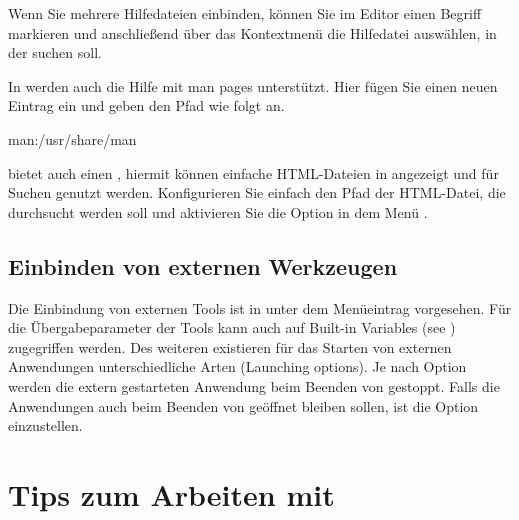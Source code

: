 Wenn Sie mehrere Hilfedateien einbinden, können Sie im Editor einen Begriff markieren und anschließend über das Kontextmenü  die Hilfedatei auswählen, in der \codeblocks suchen soll.


In \codeblocks werden auch die Hilfe mit man pages unterstützt. Hier fügen Sie einen neuen Eintrag  ein und geben den Pfad wie folgt an.

\begin{cmd}
man:/usr/share/man
\end{cmd}

\codeblocks bietet auch einen , hiermit können  einfache HTML-Dateien in \codeblocks angezeigt und für Suchen genutzt werden. Konfigurieren Sie einfach den Pfad der HTML-Datei, die durchsucht werden soll und aktivieren Sie die Option  in dem Menü .


%

\subsection{Einbinden von externen Werkzeugen}

Die Einbindung von externen Tools ist in \codeblocks unter dem Menüeintrag  vorgesehen. Für die Übergabeparameter der Tools kann auch auf Built-in Variables (see ) zugegriffen werden. Des weiteren existieren für das Starten von externen Anwendungen unterschiedliche Arten (Launching options). Je nach Option werden die extern gestarteten Anwendung beim Beenden von \codeblocks gestoppt. Falls die Anwendungen auch beim Beenden von \codeblocks geöffnet bleiben sollen, ist die Option  einzustellen.

\section{Tips zum Arbeiten mit \codeblocks}

